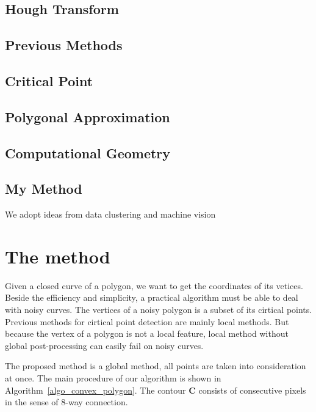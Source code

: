 \documentclass{article}
\begin{document}
\subsection{Hough Transform}
\label{sub:Hough Transform}

\subsection{Previous Methods}
\label{sub:Previous Methods}

\subsection{Critical Point}
\label{sub:Critical Point}

\subsection{Polygonal Approximation}
\label{sub:polygon}

\subsection{Computational Geometry}
\label{sub:Computational Geometry}

\subsection{My Method}
\label{sub:My Method}

We adopt ideas from data clustering and machine vision

\section{The method}
\label{sec:The method}

Given a closed curve of a polygon, we want to get the coordinates of its vetices.
Beside the efficiency and simplicity, a practical algorithm must be able
to deal with noisy curves. The vertices of a noisy polygon is a subset of its cirtical points.
Previous methods for cirtical point detection are mainly local methods. But because the vertex of a
polygon is not a local feature, local method without global post-processing can easily fail on noisy curves.

The proposed method is a global method, all points are taken into consideration at once.
The main procedure of our algorithm is shown in Algorithm~\ref{algo_convex_polygon}.
The contour $\mathbf{C}$ consists of consecutive pixels in the sense of 8-way connection. %
\end{document}

